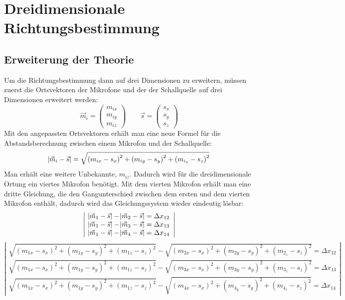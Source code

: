 \section{Dreidimensionale Richtungsbestimmung}
\subsection{Erweiterung der Theorie}
Um die Richtungsbestimmung dann auf drei Dimensionen zu erweitern, müssen zuerst die Ortsvektoren der Mikrofone und der der Schallquelle auf drei Dimensionen erweitert werden: $$\vec{m}_i = \begin{pmatrix}
m_{ix} \\
m_{iy} \\
m_{iz}
\end{pmatrix} \quad\quad
\vec{s} = \begin{pmatrix}
{s_x} \\
{s_y} \\
{s_z}
\end{pmatrix}$$
Mit den angepassten Ortsvektoren erhält man eine neue Formel für die Abstandsberechnung zwischen einem Mikrofon und der Schallquelle:
$$\abs{\vec{m}_i - \vec{s}} = \sqrt{{(m_{ix} - s_x)}^2 + {(m_{iy} - s_y)}^2 + {(m_{i_z} - s_z)}^2}$$
Man erhält eine weitere Unbekannte, $m_{iz}$. Dadurch wird für die dreidimensionale Ortung ein viertes Mikrofon benötigt. Mit dem vierten Mikrofon erhält man eine dritte Gleichung, die den Gangunterschied zwischen dem ersten und dem vierten Mikrofon enthält, dadurch wird das Gleichungssystem wieder eindeutig lösbar:
$$\left|\begin{array}{c}
\abs{\vec{m}_1 - \vec{s}} - \abs{\vec{m}_2 - \vec{s}} = \Delta{x_{12}} \\
\abs{\vec{m}_1 - \vec{s}} - \abs{\vec{m}_3 - \vec{s}} = \Delta{x_{13}} \\
\abs{\vec{m}_1 - \vec{s}} - \abs{\vec{m}_4 - \vec{s}} = \Delta{x_{14}}
\end{array}\right|$$
$$\left|\begin{array}{c}
\sqrt{{(m_{1x} - s_x)}^2 + {(m_{1y} - s_y)}^2 + {(m_{1z} - s_z)}^2} - \sqrt{{(m_{2x} - s_x)}^2 + {(m_{2y} - s_y)}^2 + {(m_{2_z} - s_z)}^2} = \Delta{x_{12}} \\
\sqrt{{(m_{1x} - s_x)}^2 + {(m_{1y} - s_y)}^2 + {(m_{1z} - s_z)}^2} - \sqrt{{(m_{3x} - s_x)}^2 + {(m_{3y} - s_y)}^2 + {(m_{3_z} - s_z)}^2} = \Delta{x_{13}} \\
\sqrt{{(m_{1x} - s_x)}^2 + {(m_{1y} - s_y)}^2 + {(m_{1z} - s_z)}^2} - \sqrt{{(m_{4x} - s_x)}^2 + {(m_{4_y} - s_y)}^2 + {(m_{4_z} - s_z)}^2} = \Delta{x_{14}}
\end{array}\right|$$
